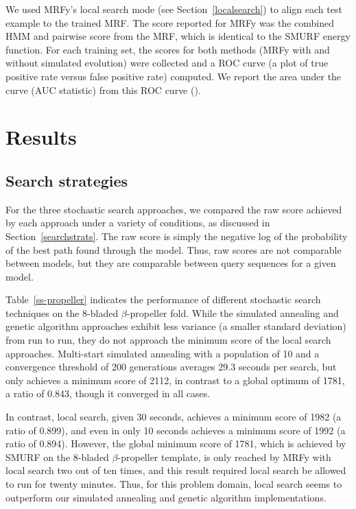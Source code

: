 \documentclass[blockstyle,times,preprint]{sigplanconf}
\begin{document}
We used MRFy's local search mode (see Section~\ref{localsearch}) to align each
test example to the trained MRF.
The score reported for MRFy was the combined HMM and pairwise score from the 
MRF, which is identical to the SMURF energy function.
For each training set, the scores for both methods (MRFy with and without
simulated evolution) were collected and a ROC curve (a plot of true positive 
rate versus false positive rate) computed. We report the area under the curve 
(AUC statistic) from this ROC curve (\cite{Sonego:2008uy}).



\section{Results}

\subsection{Search strategies}

For the three stochastic search approaches, we compared the raw score achieved
by each approach under a variety of conditions, as discussed in 
Section~\ref{searchstrats}.
The raw score is simply the negative log of the probability of the best path
found through the model.
Thus, raw scores are not comparable between models, but they are comparable
between query sequences for a given model.

Table~\ref{ss-propeller} indicates the performance of different stochastic
search techniques on the 8-bladed $\beta$-propeller fold.
While the simulated annealing and genetic algorithm approaches exhibit less
variance (a smaller standard deviation) from run to run, they do not approach
the minimum score of the local search approaches. Multi-start simulated 
annealing with a population of 10 and a convergence threshold of 200 generations
averages 29.3 seconds per search, but only achieves a minimum score of 2112, 
in contrast to a global optimum of 1781, a ratio of 0.843, though it converged 
in all cases.

In contrast, local search, given 30 seconds, achieves a minimum score of 1982 (a ratio of 0.899), 
and even in only 10 seconds achieves a minimum score of 1992 (a ratio of 0.894).
However, the global minimum score of 1781, which is achieved by SMURF on the
8-bladed $\beta$-propeller template, is only reached by MRFy with local search
two out of ten times, and this result required local search be allowed to run
for twenty minutes.
Thus, for this problem domain, local search seems to outperform our simulated
annealing and genetic algorithm implementations.
\end{document}
